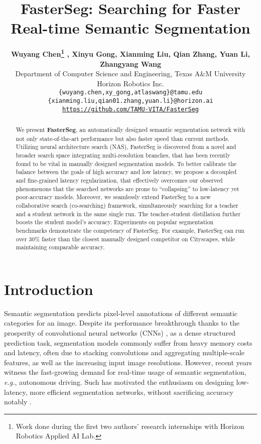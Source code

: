 \documentclass{article} \usepackage{iclr2020_conference,times}
\title{FasterSeg: Searching for Faster Real-time Semantic Segmentation}
\author{\textbf{Wuyang Chen\thanks{Work done during the first two authors' research internships with Horizon Robotics Applied AI Lab.} , Xinyu Gong\samethanks , Xianming Liu, Qian Zhang, Yuan Li, Zhangyang Wang}\\ \vspace{-0.8em}
Department of Computer Science and Engineering, Texas A\&M University\\
Horizon Robotics Inc.\\
\texttt{{\small \{wuyang.chen,xy\_gong,atlaswang\}@tamu.edu}} \\
\texttt{{\small \{xianming.liu,qian01.zhang,yuan.li\}@horizon.ai}}\\
\texttt{{\small \url{https://github.com/TAMU-VITA/FasterSeg}}}
}
\begin{document}
\maketitle




\begin{abstract}
We present \textbf{FasterSeg}, an automatically designed semantic segmentation network with not only state-of-the-art performance but also faster speed than current methods. Utilizing neural architecture search (NAS), FasterSeg is discovered from a novel and broader search space
integrating
multi-resolution branches, that has been recently found to be vital in manually designed segmentation models. 
To better calibrate the balance between the goals of high accuracy and low latency, we propose a decoupled and fine-grained latency regularization, that effectively overcomes our observed phenomenons that the searched networks are prone to ``collapsing'' to low-latency yet poor-accuracy models. 
Moreover, we seamlessly extend FasterSeg to a new collaborative search (co-searching) framework, simultaneously searching for a teacher and a student network in the same single run. The teacher-student distillation further boosts the student model's accuracy. Experiments on popular segmentation benchmarks demonstrate the competency
of FasterSeg. For example, FasterSeg can run over 30\% faster than the closest manually designed competitor on Cityscapes, while maintaining comparable accuracy.
\end{abstract}\vspace{-0.5em}

\section{Introduction}\vspace{-0.3em}

Semantic segmentation predicts pixel-level annotations of different semantic categories for an image. Despite its performance breakthrough thanks to the prosperity of convolutional neural networks (CNNs) \citep{long2015fully}, as a dense structured prediction task, segmentation models commonly suffer from heavy memory costs and latency, often due to stacking convolutions and aggregating multiple-scale features, as well as the increasing input image resolutions. However, recent years witness the fast-growing demand for real-time usage of semantic segmentation, \textit{e.g.}, autonomous driving. Such has motivated the enthusiasm on designing low-latency, more efficient segmentation networks, without sacrificing accuracy notably \citep{zhao2018icnet,yu2018bisenet}.
\end{document}
